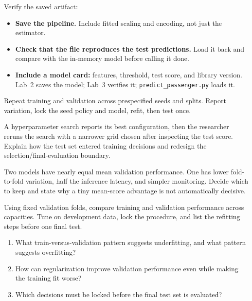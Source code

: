 Verify the saved artifact:

\begin{itemize}
  \item \textbf{Save the pipeline.} Include fitted scaling and encoding, not just the estimator.
  \item \textbf{Check that the file reproduces the test predictions.} Load it back and compare with the in-memory model before calling it done.
  \item \textbf{Include a model card:} features, threshold, test score, and library version. Lab~2 saves the model; Lab~3 verifies it; \texttt{predict\_passenger.py} loads it.
\end{itemize}

\begin{tryit}
Repeat training and validation across prespecified seeds and splits. Report variation, lock the seed policy and model, refit, then test once.
\end{tryit}

\begin{debugtask}
A hyperparameter search reports its best configuration, then the researcher reruns the search with a narrower grid chosen after inspecting the test score. Explain how the test set entered training decisions and redesign the selection/final-evaluation boundary.
\end{debugtask}

\begin{decisionmemo}
Two models have nearly equal mean validation performance. One has lower fold-to-fold variation, half the inference latency, and simpler monitoring. Decide which to keep and state why a tiny mean-score advantage is not automatically decisive.
\end{decisionmemo}

\begin{tryit}
Using fixed validation folds, compare training and validation performance across capacities. Tune on development data, lock the procedure, and list the refitting steps before one final test.
\end{tryit}

\begin{quickcheck}
\begin{enumerate}
  \item What train-versus-validation pattern suggests underfitting, and what pattern suggests overfitting?
  \item How can regularization improve validation performance even while making the training fit worse?
  \item Which decisions must be locked before the final test set is evaluated?
\end{enumerate}
\end{quickcheck}
